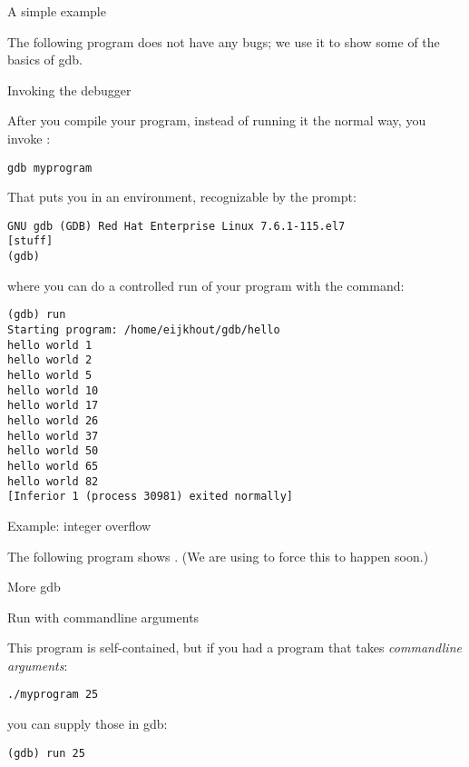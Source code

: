 
 {A simple example}

The following program does not have any bugs;
we use it to show some of the basics of gdb.


 {Invoking the debugger}

After you compile your program, instead of running it the normal way,
you invoke :
\begin{verbatim}
gdb myprogram
\end{verbatim}
That puts you in an environment,
recognizable by the  prompt:
\begin{verbatim}
GNU gdb (GDB) Red Hat Enterprise Linux 7.6.1-115.el7
[stuff]
(gdb)
\end{verbatim}
where you can do a controlled run of your program with the  command:
\begin{verbatim}
(gdb) run
Starting program: /home/eijkhout/gdb/hello
hello world 1
hello world 2
hello world 5
hello world 10
hello world 17
hello world 26
hello world 37
hello world 50
hello world 65
hello world 82
[Inferior 1 (process 30981) exited normally]
\end{verbatim}

 {Example: integer overflow}

The following program shows .
(We are using  to force this to happen soon.)


 {More gdb}

 {Run with commandline arguments}

This program is self-contained, but if you had a program that takes
\emph{commandline arguments}:
\begin{verbatim}
./myprogram 25
\end{verbatim}
you can supply those in gdb:
\begin{verbatim}
(gdb) run 25
\end{verbatim}

